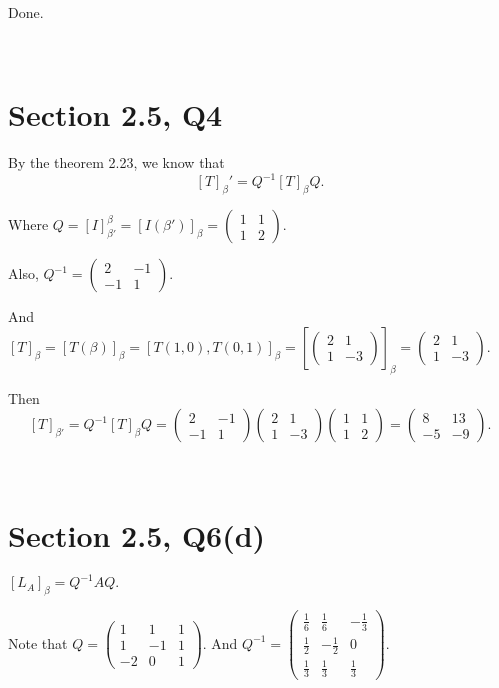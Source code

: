 \documentclass[12pt]{article}%
\begin{document}
Done. 

~\

\section{Section 2.5, Q4}

By the theorem 2.23, we know that $$[T]_\beta'=Q^{-1}[T]_\beta Q.$$

Where $Q=[I]_{\beta'}^{\beta}=[I(\beta')]_\beta=\begin{pmatrix}1&1\\1&2\end{pmatrix}.$

Also, $Q^{-1}=\begin{pmatrix}2&-1\\-1&1\end{pmatrix}.$

And $[T]_\beta=[T(\beta)]_\beta=[T(1,0),T(0,1)]_\beta=[\begin{pmatrix}2&1\\1&-3\end{pmatrix}]_\beta=\begin{pmatrix}2&1\\1&-3\end{pmatrix}.$

Then $$[T]_{\beta'}=Q^{-1}[T]_\beta Q=\begin{pmatrix}2&-1\\-1&1\end{pmatrix} \begin{pmatrix}2&1\\1&-3\end{pmatrix} \begin{pmatrix}1&1\\1&2\end{pmatrix}=\begin{pmatrix}8&13\\-5&-9\end{pmatrix}.$$

~\ 

\section{Section 2.5, Q6(d)}

$[L_A]_\beta=Q^{-1}AQ.$

Note that $Q=\begin{pmatrix}1&1&1\\1&-1&1\\-2&0&1\end{pmatrix}.$ And $Q^{-1}=\begin{pmatrix}\frac{1}{6}&\frac{1}{6}&-\frac{1}{3}\\\frac{1}{2}&-\frac{1}{2}&0\\\frac{1}{3}&\frac{1}{3}&\frac{1}{3}\end{pmatrix}.$
\end{document}
